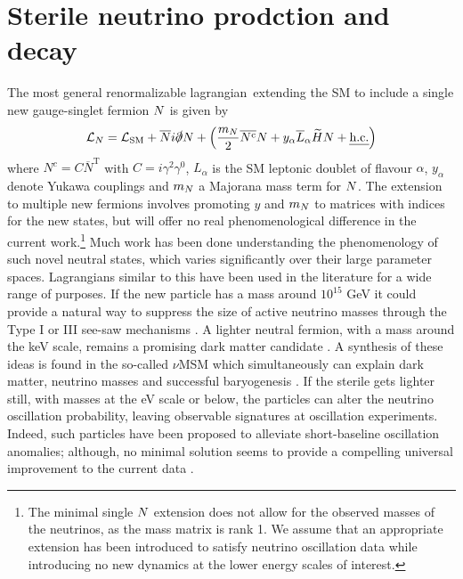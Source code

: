 \documentclass[11pt, a4paper]{article}
\def\lagrangian{lagrangian}
\def\ster{\ensuremath N}
\begin{document}
\section{\label{sec:decays}Sterile neutrino prodction and decay}

The most general renormalizable \lagrangian\ extending the SM to include a
single new gauge-singlet fermion $\ster$ is given by
%
\begin{align}   \mathcal{L}_N = \mathcal{L}_\text{SM} +
\overline{\ster}i\slashed{\partial}\ster + \left(\frac{m_\ster}{2}
\overline{\ster^\text{c}}\ster  + y_\alpha\overline{L}_\alpha\widetilde{H}
\ster + \text{\emph{h.c.}}\right)\label{eq:minimallag} \end{align}
%
where $N^c=C\overline{N}^\text{T}$ with $C=i\gamma^2\gamma^0$, $L_\alpha$ is
the SM leptonic doublet of flavour $\alpha$, $y_\alpha$ denote Yukawa couplings
and $m_\ster$ a Majorana mass term for $\ster$. The extension to multiple new
fermions involves promoting $y$ and $m_\ster$ to matrices with indices for the new
states, but will offer no real phenomenological difference in the current
work.\footnote{The minimal single $\ster$ extension does not allow for the
observed masses of the neutrinos, as the mass matrix is rank 1. We assume that
an appropriate extension has been introduced to satisfy neutrino oscillation
data while introducing no new dynamics at the lower energy scales of interest.}
Much work has been done understanding the phenomenology of such novel neutral
states, which varies significantly over their large parameter spaces. 
%
Lagrangians similar to this have been used in the literature for a wide range
of purposes. If the new particle has a mass around $10^{15}$ GeV it could
provide a natural way to suppress the size of active neutrino masses through
the Type I or III see-saw mechanisms \cite{Minkowski:1977sc, GellMann:1980vs,
Mohapatra:1979ia}. A lighter neutral fermion, with a mass around the keV scale,
remains a promising dark matter candidate \cite{Adhikari:2016bei}. A synthesis
of these ideas is found in the so-called $\nu$MSM which simultaneously can
explain dark matter, neutrino masses and successful baryogenesis
\cite{Asaka:2005pn}. 
%
If the sterile gets lighter still, with masses at the eV scale or below, the
particles can alter the neutrino oscillation probability, leaving observable
signatures at oscillation experiments. Indeed, such particles have been
proposed to alleviate short-baseline oscillation anomalies; although, no
minimal solution seems to provide a compelling universal improvement to the
current data \cite{Kopp:2013vaa,Conrad:2012qt}.
\end{document}
